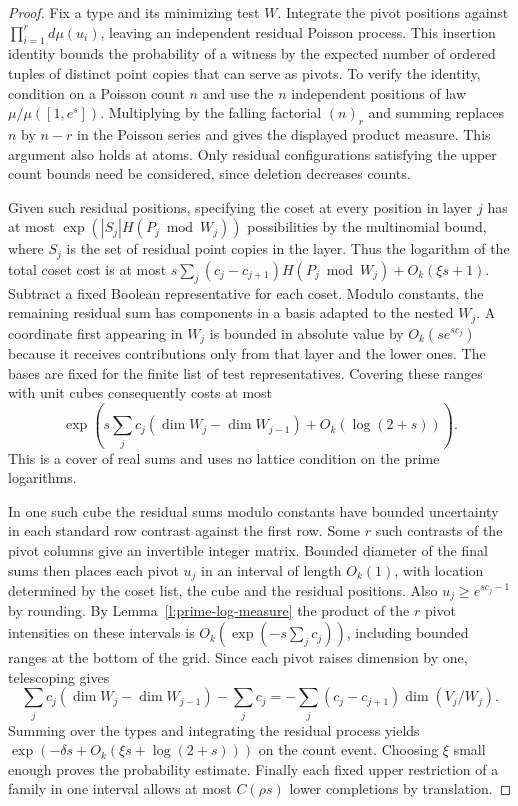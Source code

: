 \documentclass[11pt]{article}
\numberwithin{equation}{section}
\begin{document}
\begin{proof}
Fix a type and its minimizing test $W$. Integrate the pivot
positions against $\prod_{i=1}^r d\mu(u_i)$, leaving an independent
residual Poisson process. This insertion identity bounds the
probability of a witness by the expected number of ordered tuples
of distinct point copies that can serve as pivots. To verify the
identity, condition on a Poisson count $n$ and use the $n$ independent
positions of law $\mu/\mu([1,e^s])$. Multiplying by the falling
factorial $(n)_r$ and summing replaces $n$ by $n-r$ in the Poisson
series and gives the displayed product measure. This argument also
holds at atoms. Only residual configurations satisfying the upper
count bounds need be considered, since deletion decreases counts.

Given such residual positions, specifying the coset at every
position in layer $j$ has at most
$\exp(|S_j|H(P_j\bmod W_j))$ possibilities by the multinomial
bound, where $S_j$ is the set of residual point copies in the layer.
Thus the logarithm of the total coset cost is at most
$s\sum_j(c_j-c_{j+1})H(P_j\bmod W_j)+O_k(\xi s+1)$.
Subtract a fixed Boolean representative for each coset.
Modulo constants, the remaining residual sum has components in
a basis adapted to the nested $W_j$. A coordinate first appearing
in $W_j$ is bounded in absolute value by $O_k(s e^{s c_j})$
because it receives contributions only from that layer and the lower ones.
The bases are fixed for the finite list of test representatives.
Covering these ranges with unit cubes consequently costs at most
\[
 \exp\!\left(s\sum_j c_j(\dim W_j-\dim W_{j-1})
                    +O_k(\log(2+s))\right).
\]
This is a cover of real sums and uses no lattice condition on the
prime logarithms.

In one such cube the residual sums modulo constants have bounded
uncertainty in each standard row contrast against the first row.
Some $r$ such contrasts of the pivot columns give an invertible
integer matrix. Bounded diameter of the final sums then places
each pivot $u_j$ in an interval of length $O_k(1)$, with location
determined by the coset list, the cube and the residual positions.
Also $u_j\ge e^{s c_j-1}$ by rounding. By
Lemma~\ref{l:prime-log-measure} the product of the $r$ pivot
intensities on these intervals is $O_k(\exp(-s\sum_jc_j))$,
including bounded ranges at the bottom of the grid.
Since each pivot raises dimension by one, telescoping gives
\[
 \sum_j c_j(\dim W_j-\dim W_{j-1})-\sum_j c_j
  =-\sum_j(c_j-c_{j+1})\dim(V_j/W_j).
\]
Summing over the types and integrating the residual process yields
$\exp(-\delta s+O_k(\xi s+\log(2+s)))$ on the count event.
Choosing $\xi$ small enough proves the probability estimate.
Finally each fixed upper restriction of a family in one interval
allows at most $C(\rho s)$ lower completions by translation.
\end{proof}
\end{document}
